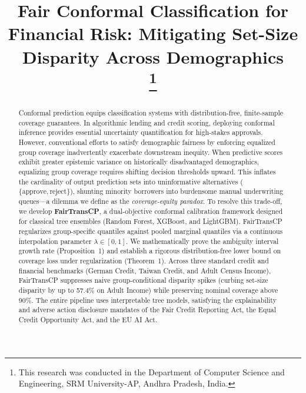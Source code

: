\documentclass[conference]{IEEEtran}
\begin{document}
\title{Fair Conformal Classification for Financial Risk: Mitigating Set-Size Disparity Across Demographics\\
\thanks{This research was conducted in the Department of Computer Science and Engineering, SRM University-AP, Andhra Pradesh, India.}
}

\author{
}

\maketitle

\begin{abstract}
Conformal prediction equips classification systems with distribution-free, finite-sample coverage guarantees. In algorithmic lending and credit scoring, deploying conformal inference provides essential uncertainty quantification for high-stakes approvals. However, conventional efforts to satisfy demographic fairness by enforcing equalized group coverage inadvertently exacerbate downstream inequity. When predictive scores exhibit greater epistemic variance on historically disadvantaged demographics, equalizing group coverage requires shifting decision thresholds upward. This inflates the cardinality of output prediction sets into uninformative alternatives ($\{\text{approve}, \text{reject}\}$), shunting minority borrowers into burdensome manual underwriting queues—a dilemma we define as the \emph{coverage-equity paradox}. To resolve this trade-off, we develop \textbf{FairTransCP}, a dual-objective conformal calibration framework designed for classical tree ensembles (Random Forest, XGBoost, and LightGBM). FairTransCP regularizes group-specific quantiles against pooled marginal quantiles via a continuous interpolation parameter $\lambda \in [0, 1]$. We mathematically prove the ambiguity interval growth rate (Proposition~1) and establish a rigorous distribution-free lower bound on coverage loss under regularization (Theorem~1). Across three standard credit and financial benchmarks (German Credit, Taiwan Credit, and Adult Census Income), FairTransCP suppresses naive group-conditional disparity spikes (curbing set-size disparity by up to 57.4\% on Adult Income) while preserving nominal coverage above 90\%. The entire pipeline uses interpretable tree models, satisfying the explainability and adverse action disclosure mandates of the Fair Credit Reporting Act, the Equal Credit Opportunity Act, and the EU AI Act.
\end{abstract}
\end{document}
